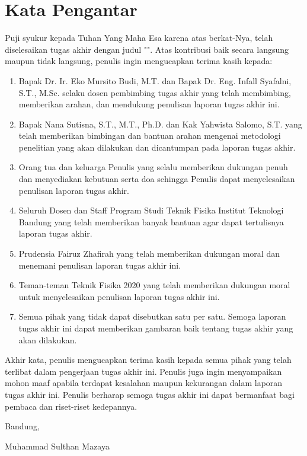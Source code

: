 \chapter*{Kata Pengantar}

Puji syukur kepada Tuhan Yang Maha Esa karena atas berkat-Nya, telah diselesaikan tugas akhir dengan judul "\thetitle".
Atas kontribusi baik secara langsung maupun tidak langsung, penulis ingin
mengucapkan terima kasih kepada:

\begin{enumerate}
	\item Bapak Dr. Ir. Eko Mursito Budi, M.T. dan Bapak Dr. Eng. Infall Syafalni, S.T., M.Sc. selaku dosen pembimbing tugas akhir yang telah membimbing, memberikan arahan, dan mendukung penulisan laporan tugas akhir ini.
	\item Bapak Nana Sutisna, S.T., M.T., Ph.D. dan Kak Yahwista Salomo, S.T. yang telah memberikan bimbingan dan bantuan arahan mengenai metodologi penelitian yang akan dilakukan dan dicantumpan pada laporan tugas akhir.
	\item Orang tua dan keluarga Penulis yang selalu memberikan dukungan penuh dan menyediakan kebutuan serta doa sehingga Penulis dapat menyelesaikan penulisan laporan tugas akhir.
	\item Seluruh Dosen dan Staff Program Studi Teknik Fisika Institut Teknologi Bandung yang telah memberikan banyak bantuan agar dapat tertulisnya laporan tugas akhir.
	\item Prudensia Fairuz Zhafirah yang telah memberikan dukungan moral dan menemani penulisan laporan tugas akhir ini.
	\item Teman-teman Teknik Fisika 2020 yang telah memberikan dukungan moral untuk menyelesaikan penulisan laporan tugas akhir ini.
	\item Semua pihak yang tidak dapat disebutkan satu per satu. Semoga laporan tugas akhir ini dapat memberikan gambaran baik tentang tugas akhir yang akan dilakukan.
\end{enumerate}

Akhir kata, penulis mengucapkan terima kasih kepada semua pihak yang telah terlibat dalam pengerjaan tugas akhir ini. Penulis juga ingin menyampaikan mohon maaf apabila terdapat kesalahan maupun kekurangan dalam laporan tugas akhir ini. Penulis berharap semoga tugas akhir ini dapat bermanfaat bagi pembaca dan riset-riset kedepannya.

\begin{flushright}
	\vspace{0.5cm}
	Bandung, \tanggalpengesahan
	
	
	\vspace{1.5cm}
	
	Muhammad Sulthan Mazaya
\end{flushright}
